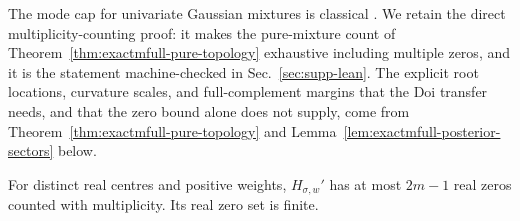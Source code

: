 The mode cap for univariate Gaussian mixtures is classical
\cite{carreiraPerpinanWilliams2003modes,amendolaEngstromHaase2020modes}.
We retain the direct multiplicity-counting proof: it makes the pure-mixture
count of Theorem~\ref{thm:exactmfull-pure-topology} exhaustive including
multiple zeros, and it is the statement machine-checked in
Sec.~\ref{sec:supp-lean}.  The explicit root locations, curvature scales,
and full-complement margins that the Doi transfer needs, and that the zero
bound alone does not supply, come from
Theorem~\ref{thm:exactmfull-pure-topology} and
Lemma~\ref{lem:exactmfull-posterior-sectors} below.

\begin{lemma}
\label{lem:exactmfull-zero-bound}
For distinct real centres and positive weights,
\(H_{\sigma,w}'\) has at most \(2m-1\) real zeros counted with
multiplicity.  Its real zero set is finite.
\end{lemma}

